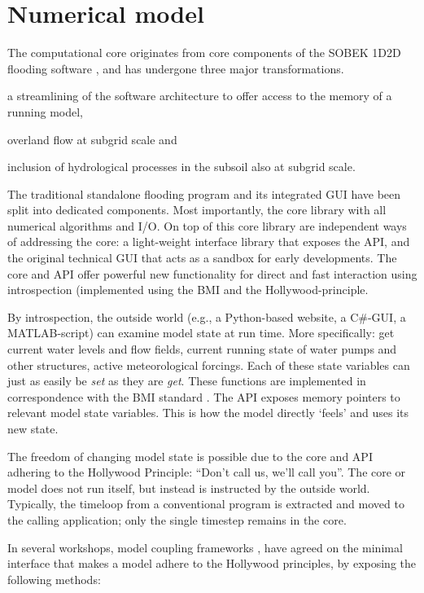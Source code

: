 \documentclass[a4paper]{article}
\begin{document}
\section{Numerical model}
The computational core originates from core components of the {SOBEK} 1D2D flooding software \citep{Stelling2006}, and has undergone three major transformations. \begin{inparaenum}
\item a streamlining of the software architecture to offer access to the memory of a running model,
\item overland flow at subgrid scale and
\item inclusion of hydrological processes in the subsoil also at subgrid scale.
\end{inparaenum}

The traditional standalone flooding program and its integrated \ac{GUI} have been split into dedicated components. Most importantly, the core library with all numerical algorithms and I/O. On top of this core library are independent ways of addressing the core: a light-weight interface library that exposes the \ac{API}, and the original technical \ac{GUI} that acts as a sandbox for early developments.
The core and \ac{API} offer powerful new functionality for direct and fast interaction using introspection (implemented using the \ac{BMI} and the Hollywood-principle.

By introspection, the outside world (e.g., a Python-based website, a C\#-\ac{GUI}, a MATLAB-script) can examine model state at run time. More specifically: get current water levels and flow fields, current running state of water pumps and other structures, active meteorological forcings. Each of these state variables can just as easily be \emph{set} as they are \emph{get}. These functions are implemented in correspondence with the \ac{BMI} standard \citep{Peckham2013}. The \ac{API} exposes memory pointers to relevant model state variables. This is how the model directly `feels' and uses its new state.

The freedom of changing model state is possible due to the core and \ac{API} adhering to the Hollywood Principle: ``Don't call us, we'll call you''. The core or model does not run itself, but instead is instructed by the outside world. Typically, the timeloop from a conventional program is extracted and moved to the calling application; only the single timestep remains in the core.

In several workshops, model coupling frameworks \citep[see][for an overview]{Jagers2010}, have agreed on the minimal interface that makes a model adhere to the Hollywood principles, by exposing the following methods:
\end{document}
